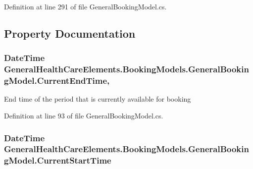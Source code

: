 Definition at line 291 of file General\+Booking\+Model.\+cs.



\subsection{Property Documentation}
\subsubsection[{\texorpdfstring{Current\+End\+Time}{CurrentEndTime}}]{\setlength{\rightskip}{0pt plus 5cm}Date\+Time General\+Health\+Care\+Elements.\+Booking\+Models.\+General\+Booking\+Model.\+Current\+End\+Time\hspace{0.3cm}{\ttfamily [get]}, {\ttfamily [set]}}\hypertarget{class_general_health_care_elements_1_1_booking_models_1_1_general_booking_model_a55ca5633f2692b20bb9e109fa7ae8598}{}\label{class_general_health_care_elements_1_1_booking_models_1_1_general_booking_model_a55ca5633f2692b20bb9e109fa7ae8598}


End time of the period that is currently available for booking 



Definition at line 93 of file General\+Booking\+Model.\+cs.

\subsubsection[{\texorpdfstring{Current\+Start\+Time}{CurrentStartTime}}]{\setlength{\rightskip}{0pt plus 5cm}Date\+Time General\+Health\+Care\+Elements.\+Booking\+Models.\+General\+Booking\+Model.\+Current\+Start\+Time\hspace{0.3cm}{\ttfamily [get]}}\hypertarget{class_general_health_care_elements_1_1_booking_models_1_1_general_booking_model_a078fedbdba4ec3adb3c01f05697bf12b}{}\label{class_general_health_care_elements_1_1_booking_models_1_1_general_booking_model_a078fedbdba4ec3adb3c01f05697bf12b}


